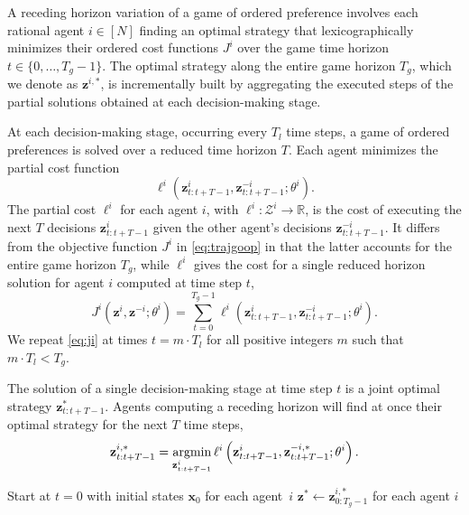 A receding horizon variation of a game
of ordered preference involves each rational agent \(i \in [N]\)
finding an optimal strategy
that lexicographically minimizes their ordered cost functions \(J^i\)
over the game time horizon \(t \in \{0, \dots, T_g-1\}\).
The optimal strategy along the entire game horizon \(T_g\),
which we denote as \(\mathbf{z}^{i,*}\), is incrementally built
by aggregating the executed steps of the partial solutions
obtained at each decision-making stage.

At each decision-making stage,
occurring every \(T_l\) time steps, a game
of ordered preferences is solved
over a reduced time horizon \(T\).
Each agent minimizes the partial cost function
$$\ell^i\left(\mathbf{z}^i_{t:t+T-1}, \mathbf{z}^{-i}_{t:t+T-1}; \theta^i\right)\text{.}$$
The partial cost \(\ell^i\) for each agent \(i\), with \(\ell^i \colon \mathcal{Z}^{i} \to \mathbb{R}\),
is the cost of executing the next \(T\) decisions \(\mathbf{z}^i_{t:t+T-1}\)
given the other agent's decisions \(\mathbf{z}^{-i}_{t:t+T-1}\).
It differs from the objective function \(J^i\) in \cref{eq:trajgoop} in that
the latter accounts for the entire game horizon \(T_g\), while \(\ell^i\) gives the cost for a
single reduced horizon solution for agent \(i\)
computed at time step \(t\),
\begin{equation}\label{eq:ji}
J^i\left(\mathbf{z}^i, \mathbf{z}^{-i}; \theta^i\right) = \sum_{t = 0}^{T_g-1} \ell^i\left(\mathbf{z}^i_{t:t+T-1}, \mathbf{z}^{-i}_{t:t+T-1}; \theta^i\right).
\end{equation}
We repeat \cref{eq:ji} at times \(t = m \cdot T_l\) for all positive integers \(m\) such that \(m \cdot T_l < T_g\).

The solution of a single decision-making stage at time step \(t\)
is a joint optimal strategy \(\mathbf{z}^*_{t:t+T-1}\).
Agents computing a receding horizon will find
at once their optimal strategy for the next \(T\) time steps,
\begin{equation*}
\mathbf{z}^{i,*}_{t:t+T-1} = \mathop{\textrm{argmin}}_{\mathbf{z}^{i}_{t:t+T-1}} \ell^i \left(\mathbf{z}^i_{t:t+T-1}, \mathbf{z}^{-i,*}_{t:t+T-1}; \theta^i \right).
\end{equation*}

\begin{algorithm}
\medskip
Start at $t = 0$ with initial states $\mathbf{x}_0$ for each agent~$i$\;
$\mathbf{z}^{*} \gets \mathbf{z}_{0:T_g-1}^{i,*}$ for each agent $i$\;
\caption{Receding horizon for games of ordered preference.}
\label{alg:rhgoop}
\end{algorithm}

